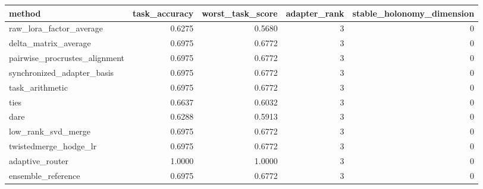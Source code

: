\begin{tabular}{lrrrr}
\toprule
method & task_accuracy & worst_task_score & adapter_rank & stable_holonomy_dimension \\
\midrule
raw_lora_factor_average & 0.6275 & 0.5680 & 3 & 0 \\
delta_matrix_average & 0.6975 & 0.6772 & 3 & 0 \\
pairwise_procrustes_alignment & 0.6975 & 0.6772 & 3 & 0 \\
synchronized_adapter_basis & 0.6975 & 0.6772 & 3 & 0 \\
task_arithmetic & 0.6975 & 0.6772 & 3 & 0 \\
ties & 0.6637 & 0.6032 & 3 & 0 \\
dare & 0.6288 & 0.5913 & 3 & 0 \\
low_rank_svd_merge & 0.6975 & 0.6772 & 3 & 0 \\
twistedmerge_hodge_lr & 0.6975 & 0.6772 & 3 & 0 \\
adaptive_router & 1.0000 & 1.0000 & 3 & 0 \\
ensemble_reference & 0.6975 & 0.6772 & 3 & 0 \\
\bottomrule
\end{tabular}
